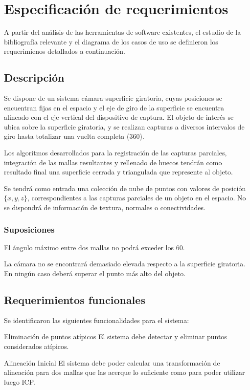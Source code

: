 \section{Especificación de requerimientos}
A partir del análisis de las herramientas de software existentes,
el estudio de la bibliografía relevante y el diagrama de los casos de uso
se definieron los requerimienos detallados a continuación.

\subsection{Descripción}
	Se dispone de un sistema cámara-superficie giratoria, cuyas posiciones
	se encuentran fijas en el espacio y el eje de giro de la superficie se
	encuentra alineado con el eje vertical del dispositivo de captura.
	El objeto de interés se ubica sobre la superficie giratoria, y se
	realizan capturas a diversos intervalos de giro
	hasta totalizar una vuelta completa (360\textdegree).

	Los algoritmos desarrollados para la registración de las capturas parciales,
	integración de las mallas resultantes y rellenado de huecos tendrán como resultado final
	una superficie cerrada y triangulada que represente al objeto.

	Se tendrá como entrada una colección de nube de puntos
	con valores de posición $\{x, y, z\}$,
	correspondientes a las capturas parciales de un objeto en el espacio.
	No se dispondrá de información de textura, normales o conectividades.

	\subsubsection{Suposiciones}
		El ángulo máximo entre dos mallas no podrá exceder los 60\textdegree.

		La cámara no se encontrará demasiado elevada respecto a la
		superficie giratoria. En ningún caso deberá superar el punto más alto del objeto.

\subsection{Requerimientos funcionales}
Se identificaron las siguientes funcionalidades para el sistema:

	\Requerimiento
		{Eliminación de puntos atípicos}
		{El sistema debe detectar y eliminar puntos considerados atípicos.}

	\Requerimiento
		{Alineación Inicial}
		{El sistema debe poder calcular una transformación de alineación para dos mallas
		que las acerque lo suficiente como para poder utilizar luego ICP.}

